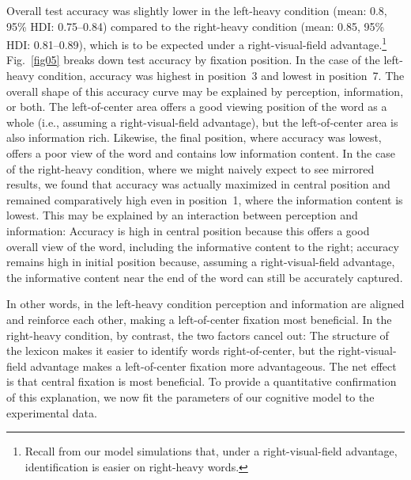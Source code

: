 \documentclass[doc,biblatex,floatsintext]{apa7}
\begin{document}
Overall test accuracy was slightly lower in the left-heavy condition (mean: 0.8, 95\% HDI: 0.75--0.84) compared to the right-heavy condition (mean: 0.85, 95\% HDI: 0.81--0.89), which is to be expected under a right-visual-field advantage.\footnote{Recall from our model simulations that, under a right-visual-field advantage, identification is easier on right-heavy words.} Fig.~\ref{fig05} breaks down test accuracy by fixation position. In the case of the left-heavy condition, accuracy was highest in position~3 and lowest in position~7. The overall shape of this accuracy curve may be explained by perception, information, or both. The left-of-center area offers a good viewing position of the word as a whole (i.e., assuming a right-visual-field advantage), but the left-of-center area is also information rich. Likewise, the final position, where accuracy was lowest, offers a poor view of the word and contains low information content. In the case of the right-heavy condition, where we might naively expect to see mirrored results, we found that accuracy was actually maximized in central position and remained comparatively high even in position~1, where the information content is lowest. This may be explained by an interaction between perception and information: Accuracy is high in central position because this offers a good overall view of the word, including the informative content to the right; accuracy remains high in initial position because, assuming a right-visual-field advantage, the informative content near the end of the word can still be accurately captured.

In other words, in the left-heavy condition perception and information are aligned and reinforce each other, making a left-of-center fixation most beneficial. In the right-heavy condition, by contrast, the two factors cancel out: The structure of the lexicon makes it easier to identify words right-of-center, but the right-visual-field advantage makes a left-of-center fixation more advantageous. The net effect is that central fixation is most beneficial. To provide a quantitative confirmation of this explanation, we now fit the parameters of our cognitive model to the experimental data.
\end{document}
